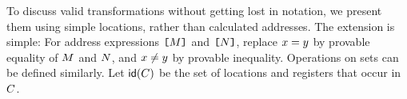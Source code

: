 
To discuss valid transformations without getting lost in notation, we present
them using simple locations, rather than calculated addresses.  The extension
is simple: For address expressions $\texttt{[}M\texttt{]}$ and $\texttt{[}N\texttt{]}$, replace
$x=y$ by provable equality of $M$ and $N$, and
$x\neq y$ by provable inequality.  Operations on
sets can be defined similarly.
%
Let $\mathsf{id}(C)$ be the set of locations and registers that occur in $C$.

